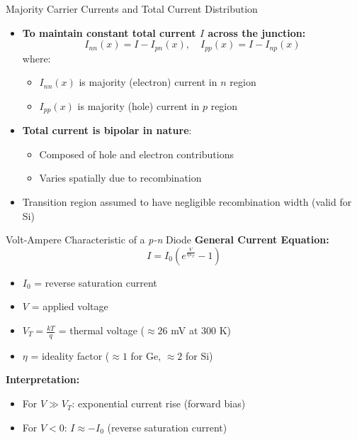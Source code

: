 \begin{frame}{Majority Carrier Currents and Total Current Distribution}
\begin{itemize}
\item \textbf{To maintain constant total current $I$ across the junction:}
\begin{equation}
	I_{nn}(x) = I - I_{pn}(x), \quad I_{pp}(x) = I - I_{np}(x)
\end{equation}
where:
\begin{itemize}
	\item $I_{nn}(x)$ is majority (electron) current in $n$ region
	\item $I_{pp}(x)$ is majority (hole) current in $p$ region
\end{itemize}

\item \textbf{Total current is bipolar in nature}:
\begin{itemize}
	\item Composed of hole and electron contributions
	\item Varies spatially due to recombination
\end{itemize}
\item Transition region assumed to have negligible recombination width (valid for Si)
\end{itemize}
\end{frame}

	\begin{frame}{Volt-Ampere Characteristic of a \textit{p-n} Diode}
	\textbf{General Current Equation:}
	\begin{equation}
		I = I_0 \left( e^{\frac{V}{\eta V_T}} - 1 \right)
	\end{equation}
	\begin{itemize}
		\item $I_0$ = reverse saturation current
		\item $V$ = applied voltage
		\item $V_T = \frac{kT}{q}$ = thermal voltage ($\approx 26$ mV at 300 K)
		\item $\eta$ = ideality factor ($\approx 1$ for Ge, $\approx 2$ for Si)
	\end{itemize}
	
	\textbf{Interpretation:}
	\begin{itemize}
		\item For $V \gg V_T$: exponential current rise (forward bias)
		\item For $V < 0$: $I \approx -I_0$ (reverse saturation current)
	\end{itemize}

\end{frame}



